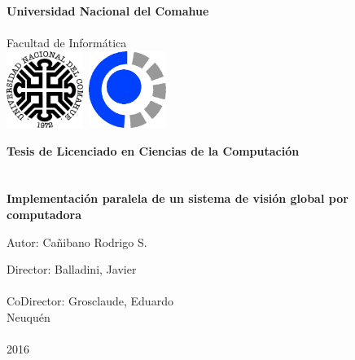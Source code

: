 
\titlepage

\begin{center}
\ \\
\ \\
\vspace{-1cm}
 

\ \\

\vspace{0.5cm}
{\Large{\bf \sc Universidad Nacional del Comahue}}\\

\ \\
{\Large { \sc Facultad de Informática}}\\

\vspace{-2.5cm}
\mbox{\hspace{-1cm}\includegraphics[width=2.5cm,height=2.5cm]{logos/unc.png}\hspace{13cm} \includegraphics[width=2.5cm,height=2.5cm]{logos/fai.png}}


\vspace{6cm}

{\Large {\bf\sc Tesis de Licenciado en Ciencias de la Computación}}\\
\ \\
\ \\
{\LARGE {\bf Implementación paralela de un sistema de visión global por computadora}}\\
\vspace{3cm}

{\Large Autor: Cañibano Rodrigo S.}\\
\vspace{2cm}

{\Large Director: Balladini, Javier}\\
\ \\
{\Large CoDirector: Grosclaude, Eduardo}\\

\vfill
{\Large {\sc Neuquén}\hspace{6cm}{\sc Argentina}}\\
\ \\

{\Large 2016}\\

\end{center}

\pagebreak

